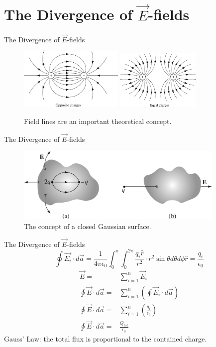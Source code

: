 \documentclass{beamer}
\begin{document}
\section{The Divergence of $\vec{E}$-fields}

\begin{frame}{The Divergence of $\vec{E}$-fields}
\begin{figure}
\centering
\includegraphics[width=5cm]{figures/2_13.jpg}
\includegraphics[width=4cm]{figures/2_14.jpg}
\caption{\label{fig:fieldLines} Field lines are an important theoretical concept.}
\end{figure}
\end{frame}

\begin{frame}{The Divergence of $\vec{E}$-fields}
\begin{figure}
\centering
\includegraphics[width=10cm]{figures/2_16.jpg}
\caption{\label{fig:fieldLines2} The concept of a closed Gaussian surface.}
\end{figure}
\end{frame}

\begin{frame}{The Divergence of $\vec{E}$-fields}
\begin{equation}
\boxed{
\oint \vec{E_i} \cdot d\vec{a} = \frac{1}{4\pi \epsilon_0} \int_0^{\pi} \int_0^{2\pi} \frac{q_i\hat{r}}{r^2} \cdot r^2 \sin\theta d\theta d\phi \hat{r} = \frac{q_i}{\epsilon_0}
}
\end{equation}
\begin{align}
\vec{E} =& \sum_{i=1}^n \vec{E}_i \\
\oint \vec{E} \cdot d\vec{a} =& \sum_{i=1}^n \left(\oint \vec{E}_i \cdot d\vec{a}\right) \\
\oint \vec{E} \cdot d\vec{a} =& \sum_{i=1}^n \left( \frac{q_i}{\epsilon_0} \right) \\
\oint \vec{E} \cdot d\vec{a} =& \frac{Q_{tot}}{\epsilon_0}
\end{align}
\alert{Gauss' Law: the total flux is proportional to the contained charge.}
\end{frame}
\end{document}
